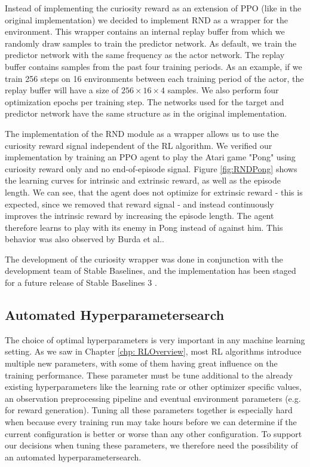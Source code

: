 Instead of implementing the curiosity reward as an extension of PPO (like in the original implementation) we decided to implement RND as a wrapper for the environment. This wrapper contains an internal replay buffer from which we randomly draw samples to train the predictor network. As default, we train the predictor network with the same frequency as the actor network. The replay buffer contains samples from the past four training periods. As an example, if we train 256 steps on 16 environments between each training period of the actor, the replay buffer will have a size of $256 \times 16 \times 4$ samples. We also perform four optimization epochs per training step. The networks used for the target and predictor network have the same structure as in the original implementation. 

The implementation of the RND module as a wrapper allows us to use the curiosity reward signal independent of the RL algorithm. We verified our implementation by training an PPO agent to play the Atari game "Pong" using curiosity reward only and no end-of-episode signal. Figure \ref{fig:RNDPong} shows the learning curves for intrinsic and extrinsic reward, as well as the episode length. We can see, that the agent does not optimize for extrinsic reward - this is expected, since we removed that reward signal - and instead continuously improves the intrinsic reward by increasing the episode length. The agent therefore learns to play with its enemy in Pong instead of against him. This behavior was also observed by Burda et al.\cite{burda2018exploration}.

The development of the curiosity wrapper was done in conjunction with the development team of Stable Baselines, and the implementation has been staged for a future release of Stable Baselines 3 \cite{stable-baselines-intrinsic}.

\subsection{Automated Hyperparametersearch} \label{sec:blSearch}
The choice of optimal hyperparameters is very important in any machine learning setting. As we saw in Chapter \ref{chp: RLOverview}, most RL algorithms introduce multiple new parameters, with some of them having great influence on the training performance. These parameter must be tune additional to the already existing hyperparameters like the learning rate or other optimizer specific values, an observation preprocessing pipeline and eventual environment parameters (e.g. for reward generation). Tuning all these parameters together is especially hard when because every training run may take hours before we can determine if the current configuration is better or worse than any other configuration. To support our decisions when tuning these parameters, we therefore need the possibility of an automated hyperparametersearch. 

